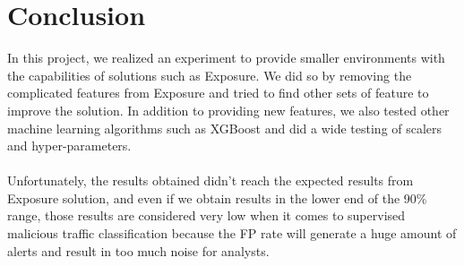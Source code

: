 \chapter{Conclusion} %
\label{Conclusion} %
In this project, we realized an experiment to provide smaller environments with the capabilities of solutions such as Exposure. We did so by removing the complicated features from Exposure and tried to find other sets of feature to improve the solution. In addition to providing new features, we also tested other machine learning algorithms such as XGBoost and did a wide testing of scalers and hyper-parameters.\\
\\
Unfortunately, the results obtained didn't reach the expected results from Exposure solution, and even if we obtain results in the lower end of the 90\% range, those results are considered very low when it comes to supervised malicious traffic classification because the FP rate will generate a huge amount of alerts and result in too much noise for analysts.\\
\\


